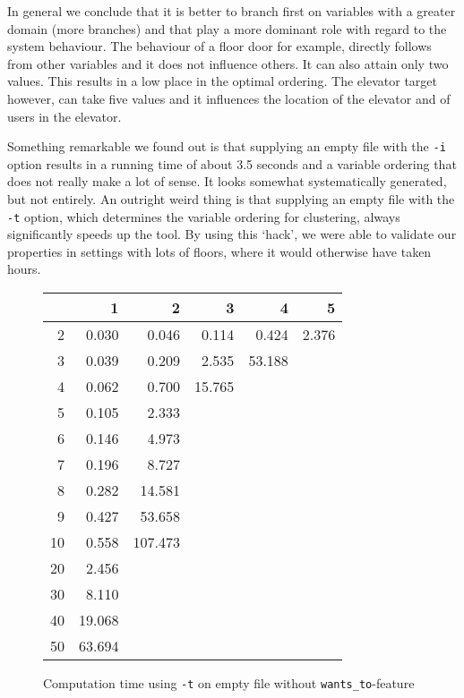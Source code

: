 \documentclass[a4paper,10pt]{article}
\begin{document}
	In general we conclude that it is better to branch first on variables with a greater domain (more branches) and that play a more dominant role with regard to the system behaviour. The behaviour of a floor door for example, directly follows from other variables and it does not influence others. It can also attain only two values. This results in a low place in the optimal ordering. The elevator target however, can take five values and it influences the location of the elevator and of users in the elevator.
	
	Something remarkable we found out is that supplying an empty file with the \texttt{-i} option results in a running time of about 3.5 seconds and a variable ordering that does not really make a lot of sense. It looks somewhat systematically generated, but not entirely. An outright weird thing is that supplying an empty file with the \texttt{-t} option, which determines the variable ordering for clustering, always significantly speeds up the tool. By using this `hack', we were able to validate our properties in settings with lots of floors, where it would otherwise have taken hours.
	
	\begin{figure}[H]
		\begin{center}
			\begin{tabular}{r|r|r|r|r|r}
				\backslashbox{$F$}{$n$} & 1 & 2 & 3 & 4 & 5 \\ \hline
				2	& 0.030		& 0.046		& 0.114		& 0.424		& 2.376	\\ \hline
				3	& 0.039		& 0.209		& 2.535		& 53.188	&		\\ \hline
				4	& 0.062		& 0.700		& 15.765	&			&		\\ \hline
				5	& 0.105		& 2.333		&			&			&		\\ \hline
				6	& 0.146		& 4.973		&			&			&		\\ \hline 
				7	& 0.196		& 8.727		&			&			&		\\ \hline
				8	& 0.282		& 14.581	&			&			&		\\ \hline
				9	& 0.427		& 53.658	&			&			&		\\ \hline
				10	& 0.558		& 107.473	&			&			&		\\ \hline
				20	& 2.456		&			&			&			&		\\ \hline
				30	& 8.110		&			&			&			&		\\ \hline
				40	& 19.068	&			&			&			&		\\ \hline
				50	& 63.694	&			&			&			&		\\ \hline
			\end{tabular}
		\end{center}
		
		\caption{Computation time using \texttt{-t} on empty file without \texttt{wants\_to}-feature}
	\end{figure}
	
\end{document}
